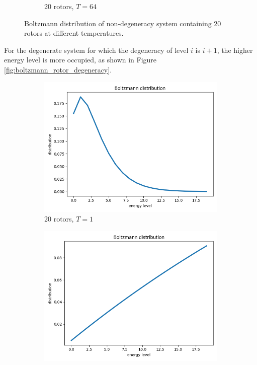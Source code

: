 \documentclass{assignmeownt}
\begin{document}
\begin{figure}
\begin{subfigure}[b]{0.4\textwidth}
      \caption{20 rotors, $T=64$}
  \end{subfigure}
     \caption{Boltzmann distribution of non-degeneracy system containing 20 rotors at different temperatures.}
     \label{fig:boltzmann_rotor}
\end{figure}


For the degenerate system for which the degeneracy of level $i$ is $i+1$, the higher energy level is more occupied, as shown in Figure \ref{fig:boltzmann_rotor_degeneracy}.

\begin{figure}
  \centering
  \begin{subfigure}[b]{0.4\textwidth}
      \centering
      \includegraphics[width=\linewidth]{../block1/2-BoltzmannDistribution/Results/degeneracy/20_1.png}
      \caption{20 rotors, $T=1$}
  \end{subfigure}
  \begin{subfigure}[b]{0.4\textwidth}
      \centering
      \includegraphics[width=\linewidth]{../block1/2-BoltzmannDistribution/Results/degeneracy/20_64.png}

\end{subfigure}
\end{figure}
\end{document}
